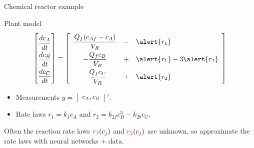\documentclass[xcolor=dvipsnames, 8pt]{beamer} %
\begin{document}
\begin{frame}{Chemical reactor example}
		
		\centerline{\resizebox{0.5\textwidth}{!}{}}
		\pause
		\begin{block}{Plant model}
			\begin{equation*}
				\renewcommand{\arraystretch}{2}
				\begin{bmatrix} 
					\dfrac{dc_A}{dt} \\
					\dfrac{dc_B}{dt} \\
					\dfrac{dc_C}{dt}
				\end{bmatrix} = \begin{bmatrix}
					\begin{array}{ccl}
						\dfrac{Q_f(c_{Af} - c_A)}{V_R} &-& \alert{r_1} 
						\\ 
						-\dfrac{Q_fc_B}{V_R} &+& \alert{r_1} - 3\alert{r_2} \\
						-\dfrac{Q_fc_C}{V_R} &+& \alert{r_2}
					\end{array}
				\end{bmatrix}
			\end{equation*}
	\begin{itemize}
		\item Measurements $y = \begin{bmatrix} c_A, c_B\end{bmatrix}'$. 
		\item Rate laws $r_1 = k_1c_A$ and $r_2 = k_{2f}c^3_B - k_{2b}c_C$.
	\end{itemize}
	\end{block}
			Often the reaction rate laws
${\color{red}r_1}(c_j)$ and ${\color{red} r_2}(c_j)$ are unknown,
so approximate the rate laws with neural networks + data.
\end{frame}
\end{document}
